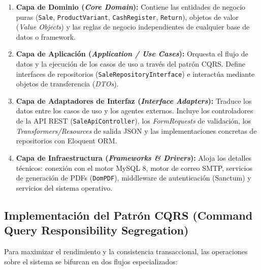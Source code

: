 \begin{enumerate}[leftmargin=*]
    \item \textbf{Capa de Dominio (\textit{Core Domain}):} Contiene las entidades de negocio puras (\texttt{Sale}, \texttt{ProductVariant}, \texttt{CashRegister}, \texttt{Return}), objetos de valor (\textit{Value Objects}) y las reglas de negocio independientes de cualquier base de datos o framework.
    \item \textbf{Capa de Aplicación (\textit{Application / Use Cases}):} Orquesta el flujo de datos y la ejecución de los casos de uso a través del patrón CQRS. Define interfaces de repositorios (\texttt{SaleRepositoryInterface}) e interactúa mediante objetos de transferencia (\textit{DTOs}).
    \item \textbf{Capa de Adaptadores de Interfaz (\textit{Interface Adapters}):} Traduce los datos entre los casos de uso y los agentes externos. Incluye los controladores de la API REST (\texttt{SaleApiController}), los \textit{FormRequests} de validación, los \textit{Transformers/Resources} de salida JSON y las implementaciones concretas de repositorios con Eloquent ORM.
    \item \textbf{Capa de Infraestructura (\textit{Frameworks \& Drivers}):} Aloja los detalles técnicos: conexión con el motor MySQL 8, motor de correo SMTP, servicios de generación de PDFs (\texttt{DomPDF}), middleware de autenticación (Sanctum) y servicios del sistema operativo.
\end{enumerate}

\subsection{Implementación del Patrón CQRS (Command Query Responsibility Segregation)}

Para maximizar el rendimiento y la consistencia transaccional, las operaciones sobre el sistema se bifurcan en dos flujos especializados:

